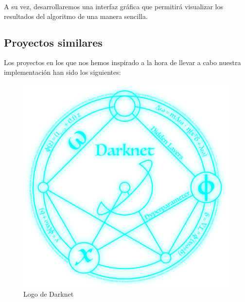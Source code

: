 \documentclass[a4paper]{article}
\begin{document}
A su vez, desarrollaremos una interfaz gráfica que permitirá visualizar los resultados del algoritmo 
de una manera sencilla.

\subsection{Proyectos similares}
Los proyectos en los que nos hemos inspirado a la hora de llevar a cabo nuestra implementación han sido los siguientes:

\begin{figure}[ht]
    \centering
    \includegraphics[scale=0.15]{images/darknet.png}
    \caption{Logo de Darknet}
    \label{fig:my_label}
\end{figure}
    
\end{document}
